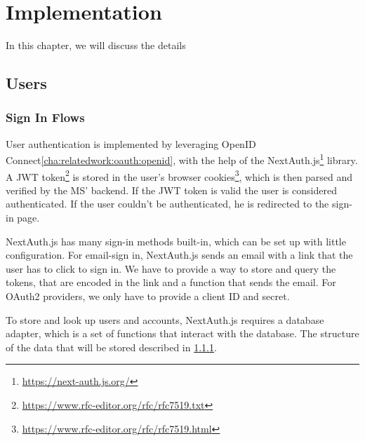\chapter{Implementation}
\label{cha:implementation}

In this chapter, we will discuss the details 



\section{Users}


%

\subsection{Sign In Flows}

User authentication is implemented by leveraging OpenID Connect\ref{cha:relatedwork:oauth:openid},
with the help of the NextAuth.js\footnote{\url{https://next-auth.js.org/}} library.
A JWT token\footnote{\url{https://www.rfc-editor.org/rfc/rfc7519.txt}}
is stored in the user's browser cookies\footnote{\url{https://www.rfc-editor.org/rfc/rfc7519.html}},
which is then parsed and verified by the MS' backend.
If the JWT token is valid the user is considered authenticated.
If the user couldn't be authenticated, he is redirected to the sign-in page.

NextAuth.js has many sign-in methods built-in, which can be set up with little configuration.
For email-sign in, NextAuth.js sends an email with a link that the user has to click to
sign in.
We have to provide a way to store and query the tokens, that are encoded in the link and a
function that sends the email.
For OAuth2 providers, we only have to provide a client ID and secret.

To store and look up users and accounts, NextAuth.js requires a database adapter,
which is a set of functions that interact with the database.
The structure of the data that will be stored described in \ref{}.

